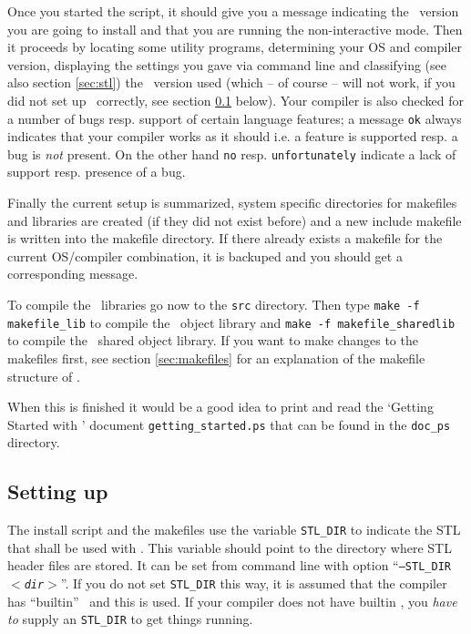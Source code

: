 Once you started the script, it should give you a message indicating
the \cgal\ version you are going to install and that you are running
the non-interactive mode. Then it proceeds by locating some utility
programs, determining your OS and compiler version, displaying the
settings you gave via command line and classifying (see also section
\ref{sec:stl}) the \stl\ version used (which -- of course -- will not
work, if you did not set up \stl\ correctly, see section
\ref{sec:stl-setup} below). Your compiler is also checked for a number
of bugs resp. support of certain language features; a message
\texttt{ok} always indicates that your compiler works as it should
i.e. a feature is supported resp. a bug is \textit{not} present. On
the other hand \texttt{no} resp.  \texttt{unfortunately} indicate a
lack of support resp. presence of a bug.

Finally the current setup is summarized, system specific directories
for makefiles and libraries are created (if they did not exist before)
and a new include makefile is written into the makefile directory. If
there already exists a makefile for the current OS/compiler
combination, it is backuped and you should get a corresponding
message.

To compile the \cgal\ libraries go now to the \texttt{src} directory.
Then type \texttt{make -f makefile\_lib} to compile the \cgal\ object
library and \texttt{make -f makefile\_sharedlib} to compile the \cgal\ 
shared object library. If you want to make changes to the makefiles
first, see section \ref{sec:makefiles} for an explanation of the
makefile structure of \cgal.

When this is finished it would be a good idea to print and read the
`Getting Started with \cgal' document \texttt{getting\_started.ps}
that can be found in the \texttt{doc\_ps} directory.

\subsection{Setting up \stl}\label{sec:stl-setup}

The install script and the makefiles use the variable
\texttt{STL\_DIR} to indicate the STL that shall be used with \cgal.
This variable should point to the directory where STL header files are
stored. It can be set from command line with option
``\texttt{--STL\_DIR \textit{$<$dir$>$}}''. If you do not set
\texttt{STL\_DIR} this way, it is assumed that the compiler has
``builtin'' \stl\ and this is used. If your compiler does not have
builtin \stl, you \textit{have to} supply an \texttt{STL\_DIR} to get
things running.

